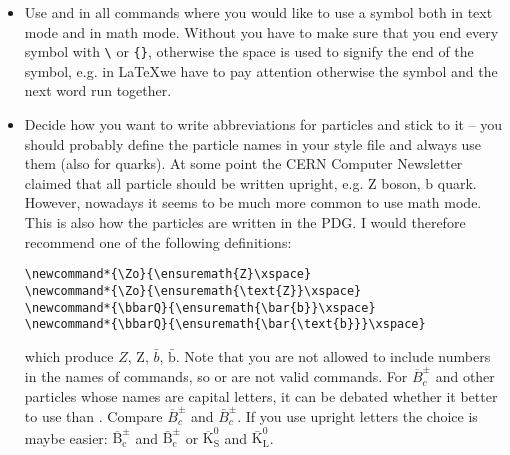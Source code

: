 \begin{itemize}
  the same symbols in slides with a sans-serif font, the text may well
  continue to be in a
  serif font.\\
  {\sffamily Compare: A common jet energy cut at the LHC is now
    $p_{T}^{\text{jet}} > \SI{20}{\GeV}$, while at HERA we typically
     {%
      used $p_{T}^{\mathrm{jet}} > \SI[obeyfamily=false]{6}{\GeV}$.
    }{%
      used $p_{T}^{\mathrm{jet}} > \SI[detect-family=false]{6}{\GeV}$.
    }}
  The \si{\GeV} in the first expression is in sans-serif. This is
  because the
  \texttt{\{detect-family=true\}}\footnote{
    in .} option is set in \texttt{ubonn-thesis.sty}
  (see Section~\ref{sec:tips:siunitx}).  I used the option
  \footnote{ in } for the  command in the 2nd expression.
  In the first expression I use  for \enquote{jet}, while
  I use  in the second expression.
\item Use  and
   in all commands where you would
  like to use a symbol both in text mode and in math mode. Without
   you have to make sure that you end every symbol with
  \texttt{\textbackslash} or \texttt{\{\}}, otherwise the space is used
  to signify the end of the symbol, e.g. in \LaTeX we have to pay
  attention otherwise the symbol and the next word run together.
\item Decide how you want to write abbreviations for particles and
  stick to it -- you should probably define the particle names in your
  style file and always use them (also for quarks). At some point the
  CERN Computer Newsletter claimed that all particle should be written
  upright, e.g. $\text{Z}$ boson, $\text{b}$ quark. However, nowadays
  it seems to be much more common to use math mode. This is also how
  the particles are written in the PDG. I would therefore
  recommend one of the following definitions:
\begin{verbatim}
\newcommand*{\Zo}{\ensuremath{Z}\xspace}
\newcommand*{\Zo}{\ensuremath{\text{Z}}\xspace}
\newcommand*{\bbarQ}{\ensuremath{\bar{b}}\xspace}
\newcommand*{\bbarQ}{\ensuremath{\bar{\text{b}}}\xspace}
\end{verbatim}
  which produce \ensuremath{Z}, \ensuremath{\text{Z}},
  \ensuremath{\bar{b}}, \ensuremath{\bar{\text{b}}}. Note that you are
  not allowed to include numbers in the names of commands, so
   or  are not valid commands. For
  $\overline{B}^{\pm}_{c}$ and other particles whose names are capital
  letters, it can be debated whether it better to use
   than
  . Compare $\overline{B}^{\pm}_{c}$ and
  $\bar{B}^{\pm}_{c}$. If you use upright letters the choice is maybe
  easier: $\overline{\text{B}}^{\pm}_{\text{c}}$ and
  $\bar{\text{B}}^{\pm}_{\text{c}}$ or
  $\overline{\text{K}}^{0}_{\text{S}}$ and
  $\bar{\text{K}}^{0}_{\text{L}}$.


\end{itemize}
